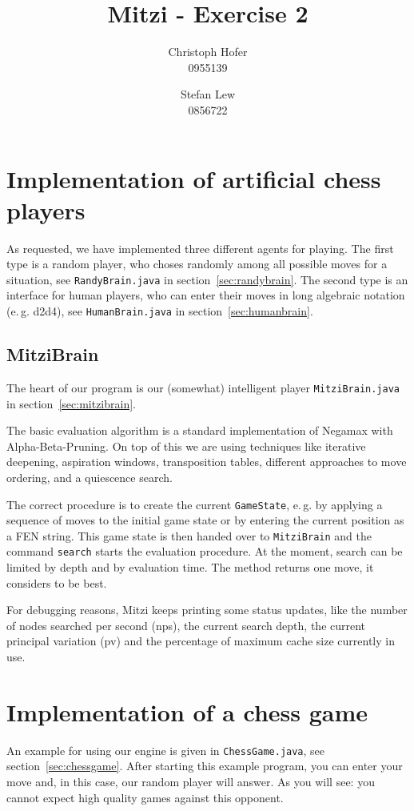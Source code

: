 \documentclass [12pt ,a4paper, english]{scrartcl}
\author{Christoph Hofer\\ 0955139 \and Stefan Lew \\ 0856722}
\title{Mitzi - Exercise 2}
\theoremstyle{plain}
\theoremstyle{definition}
\theoremstyle{remark}
\begin{document}
\maketitle
\newpage
\tableofcontents
\newpage
\section{Implementation of artificial chess players}
	As requested, we have implemented three different agents for playing. The first type is a random player, who choses randomly among all possible moves for a situation, see \verb+RandyBrain.java+ in section~\vref{sec:randybrain}. The second type is an interface for human players, who can enter their moves in long algebraic notation (e.\,g. d2d4), see \verb+HumanBrain.java+ in section~\vref{sec:humanbrain}.
\subsection{MitziBrain}
The heart of our program is our (somewhat) intelligent player \verb+MitziBrain.java+ in section~\vref{sec:mitzibrain}.

The basic evaluation algorithm is a standard implementation of Negamax with Alpha-Beta-Pruning. On top of this we are using techniques like iterative deepening, aspiration windows, transposition tables, different approaches to move ordering, and a quiescence search.

The correct procedure is to create the current \verb+GameState+, e.\,g. by applying a sequence of moves to the initial game state or by entering the current position as a FEN string. This game state is then handed over to \verb+MitziBrain+ and the command \verb+search+ starts the evaluation procedure. At the moment, search can be limited by depth and by evaluation time. The method returns one move, it considers to be best.

For debugging reasons, Mitzi keeps printing some status updates, like the number of nodes searched per second (nps), the current search depth, the current principal variation (pv) and the percentage of maximum cache size currently in use.
	
\section{Implementation of a chess game}

An example for using our engine is given in \verb+ChessGame.java+, see section~\vref{sec:chessgame}. After starting this example program, you can enter your move and, in this case, our random player will answer. As you will see: you cannot expect high quality games against this opponent.
\end{document}
